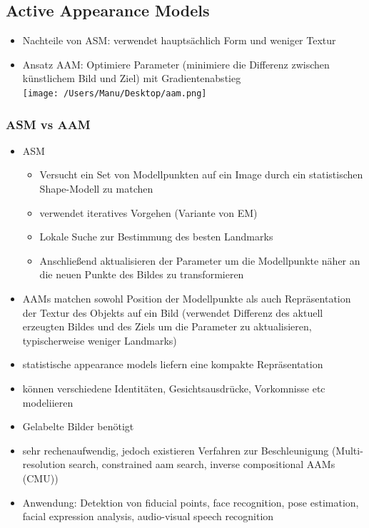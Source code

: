 \documentclass[paper=a4, fontsize=11pt]{scrartcl} %
\numberwithin{equation}{section} %
\numberwithin{figure}{section} %
\numberwithin{table}{section} %
\begin{document}
\subsection{Active Appearance Models}

\begin{itemize}
\item Nachteile von ASM: verwendet hauptsächlich Form und weniger Textur
\item Ansatz AAM: Optimiere Parameter (minimiere die Differenz zwischen künstlichem Bild und Ziel) mit Gradientenabstieg\\
\texttt{[image: /Users/Manu/Desktop/aam.png]}
\end{itemize}

\subsubsection{ASM vs AAM}

\begin{itemize}
\item ASM
\begin{itemize}
\item Versucht ein Set von Modellpunkten auf ein Image durch ein statistischen Shape-Modell zu matchen
\item verwendet iteratives Vorgehen (Variante von EM)
\item Lokale Suche zur Bestimmung des besten Landmarks
\item Anschließend aktualisieren der Parameter um die Modellpunkte näher an die neuen Punkte des Bildes zu transformieren
\end{itemize}
\item AAMs matchen sowohl Position der Modellpunkte als auch Repräsentation der Textur des Objekts auf ein Bild (verwendet Differenz des aktuell erzeugten Bildes und des Ziels um die Parameter zu aktualisieren, typischerweise weniger Landmarks)
\item statistische appearance models liefern eine kompakte Repräsentation
\item können verschiedene Identitäten, Gesichtsausdrücke, Vorkomnisse etc modeliieren
\item Gelabelte Bilder benötigt
\item sehr rechenaufwendig, jedoch existieren Verfahren zur Beschleunigung (Multi-resolution search, constrained aam search, inverse compositional AAMs (CMU))
\item Anwendung: Detektion von fiducial points, face recognition, pose estimation, facial expression analysis, audio-visual speech recognition
\end{itemize}
\end{document}
